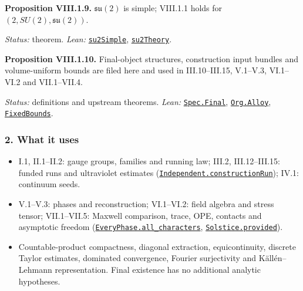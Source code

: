 \documentclass[
  letterpaper,
  11pt]{article}
\providecommand{\tightlist}{%
  \setlength{\itemsep}{0pt}\setlength{\parskip}{0pt}}
\begin{document}
\textbf{Proposition VIII.1.9.} \(\mathfrak{su}(2)\) is simple; VIII.1.1
holds for \((2,SU(2),\mathfrak{su}(2))\).

\emph{Status:} theorem. \emph{Lean:}
\href{https://github.com/yang-mills-group/OpenAI-YM-20261028/blob/3456e5e75cf8d4cd558955a5c7638fba2d68f464/ConcreteSU2.lean\#L12}{\texttt{su2Simple}},
\href{https://github.com/yang-mills-group/OpenAI-YM-20261028/blob/3456e5e75cf8d4cd558955a5c7638fba2d68f464/ConcreteSU2.lean\#L15-L18}{\texttt{su2Theory}}.

\textbf{Proposition VIII.1.10.} Final-object structures, construction
input bundles and volume-uniform bounds are filed here and used in
III.10--III.15, V.1--V.3, VI.1--VI.2 and VII.1--VII.4.

\emph{Status:} definitions and upstream theorems. \emph{Lean:}
\href{https://github.com/yang-mills-group/OpenAI-YM-20261028/blob/3456e5e75cf8d4cd558955a5c7638fba2d68f464/YM/Spec/Closed.lean\#L64-L73}{\texttt{Spec.Final}},
\href{https://github.com/yang-mills-group/OpenAI-YM-20261028/blob/3456e5e75cf8d4cd558955a5c7638fba2d68f464/YM/Org/Input.lean\#L47-L54}{\texttt{Org.Alloy}},
\href{https://github.com/yang-mills-group/OpenAI-YM-20261028/blob/3456e5e75cf8d4cd558955a5c7638fba2d68f464/YM/FullVolume/Discrete.lean\#L50-L52}{\texttt{FixedBounds}}.

\subsubsection{2. What it uses}\label{what-it-uses-31}

\begin{itemize}
\tightlist
\item
  I.1, II.1--II.2: gauge groups, families and running law; III.2,
  III.12--III.15: funded runs and ultraviolet estimates
  (\href{https://github.com/yang-mills-group/OpenAI-YM-20261028/blob/3456e5e75cf8d4cd558955a5c7638fba2d68f464/YM/Independent/ConstructionRun.lean\#L14-L28}{\texttt{Independent.constructionRun}});
  IV.1: continuum seeds.
\item
  V.1--V.3: phases and reconstruction; VI.1--VI.2: field algebra and
  stress tensor; VII.1--VII.5: Maxwell comparison, trace, OPE, contacts
  and asymptotic freedom
  (\href{https://github.com/yang-mills-group/OpenAI-YM-20261028/blob/3456e5e75cf8d4cd558955a5c7638fba2d68f464/YM/EveryPhase/Extension.lean\#L75-L80}{\texttt{EveryPhase.all\_characters}},
  \href{https://github.com/yang-mills-group/OpenAI-YM-20261028/blob/3456e5e75cf8d4cd558955a5c7638fba2d68f464/YM/Contacts/Solstice/Result.lean\#L65-L69}{\texttt{Solstice.provided}}).
\item
  Countable-product compactness, diagonal extraction, equicontinuity,
  discrete Taylor estimates, dominated convergence, Fourier surjectivity
  and Källén--Lehmann representation. Final existence has no additional
  analytic hypotheses.
\end{itemize}
\end{document}
